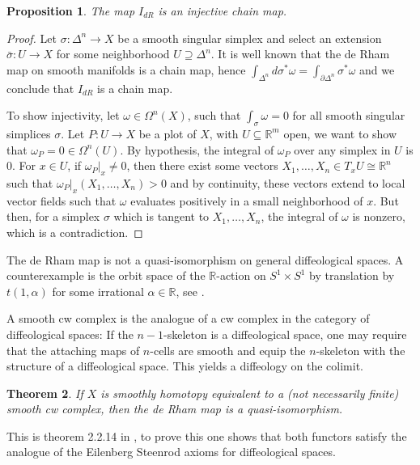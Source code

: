 \documentclass{scrartcl}
\theoremstyle{plain}
\newtheorem{theorem}{Theorem}[section]
\newtheorem{proposition}[theorem]{Proposition}
\theoremstyle{definition}
\newcommand{\R}{\mathbb R}
\renewcommand{\subset}{\subseteq}
\renewcommand{\supset}{\supseteq}
\newcommand{\iso}{\cong}
\begin{document}
\begin{proposition}\label{thm:deRham-properties}
    The map $I_{dR}$ is an injective chain map.
\end{proposition}
\begin{proof}
    Let $\sigma\colon\Delta^n\to X$ be a smooth singular simplex and select an extension $\bar \sigma\colon U\to X$ for some neighborhood $U\supset \Delta^n$. It is well known that the de Rham map on smooth manifolds is a chain map, hence $\int_{\Delta^n}d\sigma^*\omega = \int_{\partial\Delta^n}\sigma^*\omega$ and we conclude that $I_{dR}$ is a chain map. 
    
    To show injectivity, let $\omega\in \Omega^n(X)$, such that $\int_\sigma \omega = 0$ for all smooth singular simplices $\sigma$. Let $P\colon U\to X$ be a plot of $X$, with $U\subset \R^m$ open, we want to show that $\omega_P = 0\in\Omega^n(U)$. By hypothesis, the integral of $\omega_P$ over any simplex in $U$ is $0$. For $x\in U$, if $\omega_P|_x\neq 0$, then there exist some vectors $X_1,\dots, X_n\in T_xU \iso \R^n$ such that $\omega_P|_x(X_1, \dots, X_n) > 0$ and by continuity, these vectors extend to local vector fields such that $\omega$ evaluates positively in a small neighborhood of $x$. But then, for a simplex $\sigma$ which is tangent to $X_1, \dots, X_n$, the integral of $\omega$ is nonzero, which is a contradiction. 
\end{proof}

The de Rham map is not a quasi-isomorphism on general diffeological spaces. A counterexample is the orbit space of the $\R$-action on $S^1\times S^1$ by translation by $t(1, \alpha)$ for some irrational $\alpha\in \R$, see \cite{iglesias2013diffeology}.

A smooth cw complex is the analogue of a cw complex in the category of diffeological spaces: If the $n-1$-skeleton is a diffeological space, one may require that the attaching maps of $n$-cells are smooth and equip the $n$-skeleton with the structure of a diffeological space. This yields a diffeology on the colimit. 
\begin{theorem}\label{thm:diffeological-de-rham-cw}
    If $X$ is smoothly homotopy equivalent to a (not necessarily finite) smooth cw complex, then the de Rham map is a quasi-isomorphism.
\end{theorem}
This is theorem 2.2.14 in \cite{gurer2014topologie}, to prove this one shows that both functors satisfy the analogue of the Eilenberg Steenrod axioms for diffeological spaces. 
\end{document}
